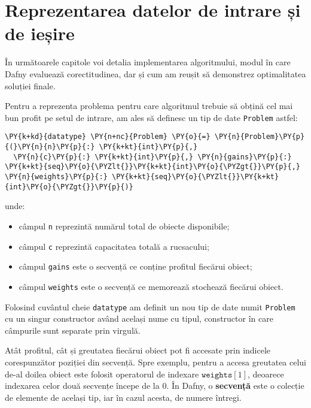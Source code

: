 \lstset{style=mylststyle}
\begin{sloppypar}

\chapter{Reprezentarea datelor de intrare și de ieșire}

În următoarele capitole voi detalia implementarea algoritmului, modul în care Dafny evaluează corectitudinea, dar și cum am reușit să demonstrez optimalitatea soluției finale. \par 
Pentru a reprezenta problema pentru care algoritmul trebuie să obțină cel mai bun profit pe setul de intrare, am ales să definesc un tip de date \texttt{Problem} astfel:

\begin{Verbatim}[commandchars=\\\{\}]
\PY{k+kd}{datatype} \PY{n+nc}{Problem} \PY{o}{=} \PY{n}{Problem}\PY{p}{(}\PY{n}{n}\PY{p}{:} \PY{k+kt}{int}\PY{p}{,} 
  \PY{n}{c}\PY{p}{:} \PY{k+kt}{int}\PY{p}{,} \PY{n}{gains}\PY{p}{:} \PY{k+kt}{seq}\PY{o}{\PYZlt{}}\PY{k+kt}{int}\PY{o}{\PYZgt{}}\PY{p}{,} \PY{n}{weights}\PY{p}{:} \PY{k+kt}{seq}\PY{o}{\PYZlt{}}\PY{k+kt}{int}\PY{o}{\PYZgt{}}\PY{p}{)} 
\end{Verbatim}
unde:
\begin{itemize}
    \item câmpul \texttt{n} reprezintă numărul total de obiecte disponibile;
    \item câmpul \texttt{c} reprezintă capacitatea totală a rucsacului;
    \item câmpul \texttt{gains} este o secvență ce conține profitul fiecărui obiect;
    \item câmpul \texttt{weights} este o secvență ce memorează stochează fiecărui obiect.
\end{itemize} \par
Folosind cuvântul cheie \texttt{datatype} am definit un nou tip de date numit \texttt{Problem} cu un singur constructor având același nume cu tipul, constructor în care câmpurile sunt separate prin virgulă.
\par
Atât profitul, cât și greutatea fiecărui obiect pot fi accesate prin indicele corespunzător poziției din secvență. Spre exemplu, pentru a accesa greutatea celui de-al doilea obiect este folosit operatorul de indexare $\texttt{weights}[1]$, deoarece indexarea celor două secvențe începe de la 0. În Dafny, o \textbf{secvență} este o colecție de elemente de același tip, iar în cazul acesta, de numere întregi.  \par

\end{sloppypar}
